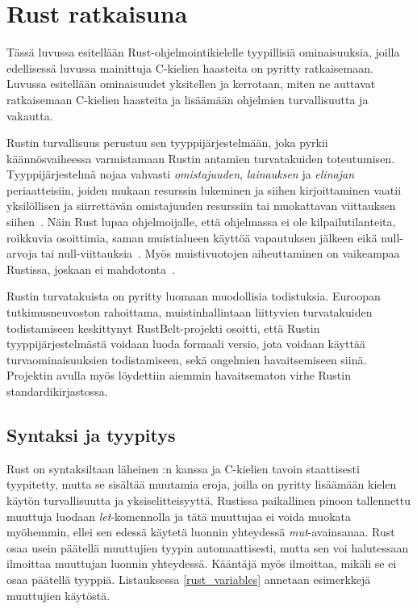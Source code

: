 \chapter{Rust ratkaisuna} \label{Rustin vahvuudet}
Tässä luvussa esitellään Rust-ohjelmointikielelle tyypillisiä ominaisuuksia, joilla edellisessä luvussa mainittuja C-kielien haasteita on pyritty ratkaisemaan. Luvussa esitellään ominaisuudet yksitellen ja kerrotaan, miten ne auttavat ratkaisemaan C-kielien haasteita ja lisäämään ohjelmien turvallisuutta ja vakautta.

Rustin turvallisuus perustuu sen tyyppijärjestelmään, joka pyrkii käännösvaiheessa varmistamaan Rustin antamien turvatakuiden toteutumisen. Tyyppijärjestelmä nojaa vahvasti \textit{omistajuuden}, \textit{lainauksen} ja \textit{elinajan} periaatteisiin, joiden mukaan resurssin lukeminen ja siihen kirjoittaminen vaatii yksilöllisen ja siirrettävän omistajuuden resurssiin tai muokattavan viittauksen siihen~\cite[p.~2]{rustbelt}. Näin Rust lupaa ohjelmoijalle, että ohjelmassa ei ole kilpailutilanteita, roikkuvia osoittimia, saman muistialueen käyttöä vapautuksen jälkeen eikä null-arvoja tai null-viittauksia~\cite[chapter~4]{rustbook}. Myös muistivuotojen aiheuttaminen on vaikeampaa Rustissa, joskaan ei mahdotonta~\cite[chapter~15.6]{rustbook}.

Rustin turvatakuista on pyritty luomaan muodollisia todistuksia. Euroopan tutkimusneuvoston rahoittama, muistinhallintaan liittyvien turvatakuiden todistamiseen keskittynyt RustBelt-projekti osoitti, että Rustin tyyppijärjestelmästä voidaan luoda formaali versio, jota voidaan käyttää turvaominaisuuksien todistamiseen, sekä ongelmien havaitsemiseen siinä. Projektin avulla myös löydettiin aiemmin havaitsematon virhe Rustin standardikirjastossa.~\cite{rustbelt}

\section{Syntaksi ja tyypitys}
Rust on syntaksiltaan läheinen \Cpp:n kanssa ja C-kielien tavoin staattisesti tyypitetty, mutta se sisältää muutamia eroja, joilla on pyritty lisäämään kielen käytön turvallisuutta ja yksiselitteisyyttä. Rustissa paikallinen pinoon tallennettu muuttuja luodaan \textit{let}-komennolla ja tätä muuttujaa ei voida muokata myöhemmin, ellei sen edessä käytetä luonnin yhteydessä \textit{mut}-avainsanaa. Rust osaa usein päätellä muuttujien tyypin automaattisesti, mutta sen voi halutessaan ilmoittaa muuttujan luonnin yhteydessä. Kääntäjä myös ilmoittaa, mikäli se ei osaa päätellä tyyppiä. Listauksessa \ref{rust_variables} annetaan esimerkkejä muuttujien käytöstä.

